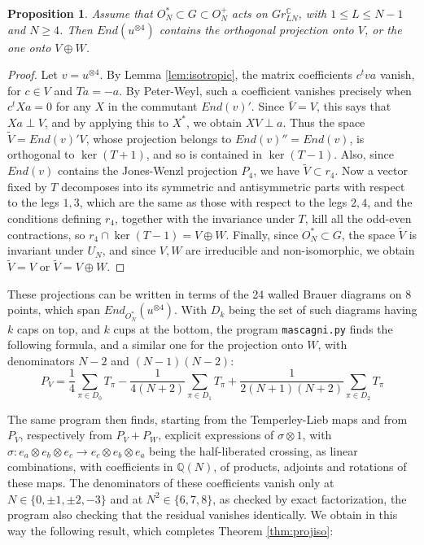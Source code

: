 \documentclass[11pt]{article}
\theoremstyle{plain}
\newtheorem{proposition}[theorem]{Proposition}
\begin{document}
\begin{proposition}
\label{prop:tannakian}
Assume that $O_N^*\subset G\subset O_N^+$ acts on $Gr^\mathbb C_{LN}$, with $1\leq L\leq N-1$ and $N\geq4$. Then $End(u^{\otimes4})$ contains the orthogonal projection onto $V$, or the one onto $V\oplus W$.
\end{proposition}

\begin{proof}
Let $v=u^{\otimes4}$. By Lemma \ref{lem:isotropic}, the matrix coefficients $c^tva$ vanish, for $c\in V$ and $Ta=-a$. By Peter-Weyl, such a coefficient vanishes precisely when $c^tXa=0$ for any $X$ in the commutant $End(v)'$. Since $\bar{V}=V$, this says that $Xa\perp V$, and by applying this to $X^*$, we obtain $XV\perp a$. Thus the space $\widetilde{V}=End(v)'V$, whose projection belongs to $End(v)''=End(v)$, is orthogonal to $\ker(T+1)$, and so is contained in $\ker(T-1)$. Also, since $End(v)$ contains the Jones-Wenzl projection $P_4$, we have $\widetilde{V}\subset r_4$. Now a vector fixed by $T$ decomposes into its symmetric and antisymmetric parts with respect to the legs $1,3$, which are the same as those with respect to the legs $2,4$, and the conditions defining $r_4$, together with the invariance under $T$, kill all the odd-even contractions, so $r_4\cap\ker(T-1)=V\oplus W$. Finally, since $O_N^*\subset G$, the space $\widetilde{V}$ is invariant under $U_N$, and since $V,W$ are irreducible and non-isomorphic, we obtain $\widetilde{V}=V$ or $\widetilde{V}=V\oplus W$.
\end{proof}

These projections can be written in terms of the 24 walled Brauer diagrams on 8 points, which span $End_{O_N^*}(u^{\otimes4})$. With $D_k$ being the set of such diagrams having $k$ caps on top, and $k$ cups at the bottom, the program {\tt mascagni.py} finds the following formula, and a similar one for the projection onto $W$, with denominators $N-2$ and $(N-1)(N-2)$:
$$P_V=\frac{1}{4}\sum_{\pi\in D_0}T_\pi-\frac{1}{4(N+2)}\sum_{\pi\in D_1}T_\pi+\frac{1}{2(N+1)(N+2)}\sum_{\pi\in D_2}T_\pi$$

The same program then finds, starting from the Temperley-Lieb maps and from $P_V$, respectively from $P_V+P_W$, explicit expressions of $\sigma\otimes1$, with $\sigma:e_a\otimes e_b\otimes e_c\to e_c\otimes e_b\otimes e_a$ being the half-liberated crossing, as linear combinations, with coefficients in $\mathbb Q(N)$, of products, adjoints and rotations of these maps. The denominators of these coefficients vanish only at $N\in\{0,\pm1,\pm2,-3\}$ and at $N^2\in\{6,7,8\}$, as checked by exact factorization, the program also checking that the residual vanishes identically. We obtain in this way the following result, which completes Theorem \ref{thm:projiso}:
\end{document}
